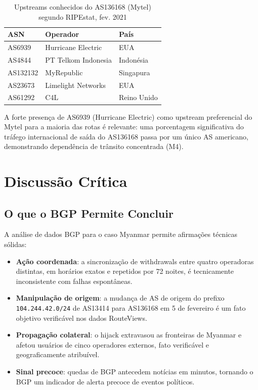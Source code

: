 \documentclass[12pt]{article}
\begin{document}
\begin{table}[ht]
\centering
\caption{Upstreams conhecidos do AS136168 (Mytel) segundo RIPEstat, fev. 2021}
\label{tab:upstreams}
\begin{tabular}{@{}lll@{}}
\toprule
\textbf{ASN} & \textbf{Operador} & \textbf{País} \\
\midrule
AS6939   & Hurricane Electric      & EUA \\
AS4844   & PT Telkom Indonesia     & Indonésia \\
AS132132 & MyRepublic              & Singapura \\
AS23673  & Limelight Networks      & EUA \\
AS61292  & C4L                     & Reino Unido \\
\bottomrule
\end{tabular}
\end{table}

A forte presença de AS6939 (Hurricane Electric) como upstream preferencial do
Mytel para a maioria das rotas é relevante: uma porcentagem significativa do
tráfego internacional de saída do AS136168 passa por um único AS americano,
demonstrando dependência de trânsito concentrada (M4).


\section{Discussão Crítica}

\subsection{O que o BGP Permite Concluir}

A análise de dados BGP para o caso Myanmar permite afirmações técnicas sólidas:

\begin{itemize}
  \item \textbf{Ação coordenada}: a sincronização de withdrawals entre quatro
    operadoras distintas, em horários exatos e repetidos por 72 noites, é
    tecnicamente inconsistente com falhas espontâneas.
  \item \textbf{Manipulação de origem}: a mudança de AS de origem do prefixo
    \texttt{104.244.42.0/24} de AS13414 para AS136168 em 5 de fevereiro é
    um fato objetivo verificável nos dados RouteViews.
  \item \textbf{Propagação colateral}: o hijack extravasou as fronteiras de
    Myanmar e afetou usuários de cinco operadores externos, fato verificável
    e geograficamente atribuível.
  \item \textbf{Sinal precoce}: quedas de BGP antecedem notícias em minutos,
    tornando o BGP um indicador de alerta precoce de eventos políticos.
\end{itemize}
\end{document}
